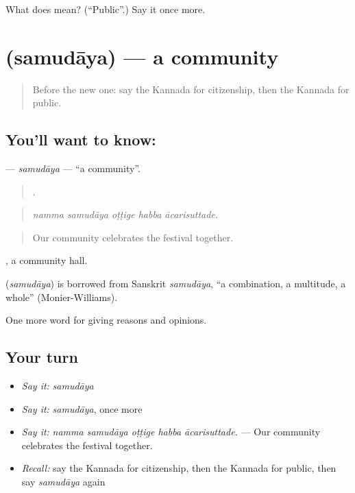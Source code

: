 \begin{tcolorbox}[breakable,colback=teal!4,colframe=teal!35!black,title={Before you move on}]
What does  mean? (\textquotedblleft{}Public\textquotedblright{}.) Say it once more.
\end{tcolorbox}
\section[\texorpdfstring{\kn{ಸಮುದಾಯ} (samudāya)}{ಸಮುದಾಯ (samudāya)}]{ (samudāya) — a community}

\label{lesson:KA-C397-samudaya}



\begin{quote}
Before the new one: say the Kannada for citizenship, then the Kannada for public.
\end{quote}

\subsection*{You'll want to know: }
\textbf{} — \emph{samudāya} — \textquotedblleft{}a community\textquotedblright{}.

\begin{quote}
    .
\end{quote}

\begin{quote}
\emph{namma samudāya oṭṭige habba ācarisuttade.}
\end{quote}

\begin{quote}
Our community celebrates the festival together.
\end{quote}

 , a community hall.

\begin{cousinweb}
\textbf{} (\emph{samudāya}) is borrowed from Sanskrit \emph{samudāya}, \textquotedblleft{}a combination, a multitude, a whole\textquotedblright{} (Monier-Williams).
\end{cousinweb}

\begin{grammarlens}[title={What you've built}]
One more word for giving reasons and opinions.
\end{grammarlens}

\subsection*{Your turn}
\begin{itemize}
\raggedright
  \item \emph{Say it:} \emph{samudāya}
  \item \emph{Say it:} \emph{samudāya}, once more
  \item \emph{Say it:} \emph{namma samudāya oṭṭige habba ācarisuttade.} — Our community celebrates the festival together.
  \item \emph{Recall:} say the Kannada for citizenship, then the Kannada for public, then say \emph{samudāya} again
\end{itemize}

